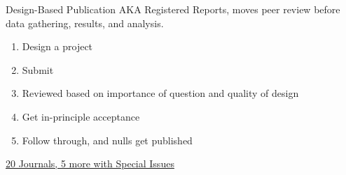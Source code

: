 \documentclass{beamer}
\begin{document}
\begin{frame}{Design-Based Publication}
AKA Registered Reports, moves peer review before data gathering, results, and analysis.

\begin{enumerate}[<.->]
\item Design a project
\item Submit
\item Reviewed based on importance of question and quality of design
\item Get in-principle acceptance
\item Follow through, and nulls get published
\end{enumerate}
\href{https://osf.io/8mpji/wiki/home/}{20 Journals, 5 more with Special Issues }
\end{frame}
\end{document}
